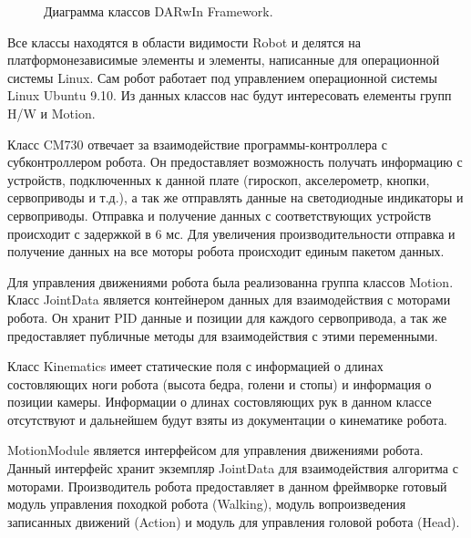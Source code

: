 \begin{figure}[h]
\caption{Диаграмма классов DARwIn Framework.}
\label{im:1_framework_class_diagram}
\end{figure}

Все классы находятся в области видимости Robot и делятся на платформонезависимые элементы и элементы, написанные для операционной системы Linux. Сам робот работает под управлением операционной системы Linux Ubuntu 9.10. Из данных классов нас будут интересовать елементы групп H/W и Motion.

Класс CM730 отвечает за взаимодействие программы-контроллера с субконтроллером робота. Он предоставляет возможность получать информацию с устройств, подключенных к данной плате (гироскоп, акселерометр, кнопки, сервоприводы и т.д.), а так же отправлять данные на светодиодные индикаторы и сервоприводы. Отправка и получение данных с соответствующих устройств происходит с задержкой в 6 мс. Для увеличения производительности отправка и получение данных на все моторы робота происходит единым пакетом данных.

Для управления движениями робота была реализованна группа классов Motion. Класс JointData является контейнером данных для взаимодействия с моторами робота. Он хранит PID данные и позиции для каждого сервопривода, а так же предоставляет публичные методы для взаимодействия с этими переменными.

Класс Kinematics имеет статические поля с информацией о длинах состовляющих ноги робота (высота бедра, голени и стопы) и информация о позиции камеры. Информации о длинах состовляющих рук в данном классе отсутствуют и дальнейшем будут взяты из документации о кинематике робота. %

MotionModule является интерфейсом для управления движениями робота. Данный интерфейс хранит экземпляр JointData для взаимодействия алгоритма с моторами. Производитель робота предоставляет в данном фреймворке готовый модуль управления походкой робота (Walking), модуль вопроизведения записанных движений (Action) и модуль для управления головой робота (Head).

